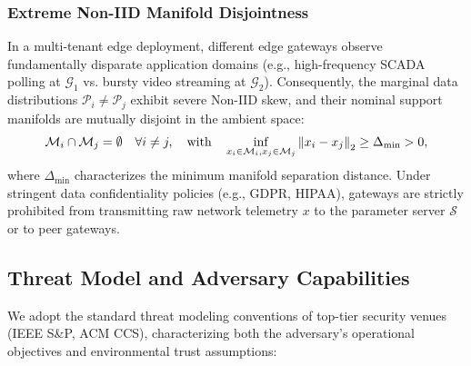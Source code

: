 \subsubsection{Extreme Non-IID Manifold Disjointness}
In a multi-tenant edge deployment, different edge gateways observe fundamentally disparate application domains (e.g., high-frequency SCADA polling at $\mathcal{G}_1$ vs. bursty video streaming at $\mathcal{G}_2$). Consequently, the marginal data distributions $\mathcal{P}_i \neq \mathcal{P}_j$ exhibit severe Non-IID skew, and their nominal support manifolds are mutually disjoint in the ambient space:
\begin{equation}
\label{eq:disjoint_manifolds}
\mathcal{M}_i \cap \mathcal{M}_j = \emptyset \quad \forall i \neq j, \quad \text{with} \quad \inf_{x_i \in \mathcal{M}_i, x_j \in \mathcal{M}_j} \left\lVert x_i - x_j\right\rVert_2 \ge \Delta_{\min} > 0,
\end{equation}
where $\Delta_{\min}$ characterizes the minimum manifold separation distance. Under stringent data confidentiality policies (e.g., GDPR, HIPAA), gateways are strictly prohibited from transmitting raw network telemetry $x$ to the parameter server $\mathcal{S}$ or to peer gateways.

\subsection{Threat Model and Adversary Capabilities}
\label{subsec:threat_model}

We adopt the standard threat modeling conventions of top-tier security venues (IEEE S\&P, ACM CCS), characterizing both the adversary's operational objectives and environmental trust assumptions:


